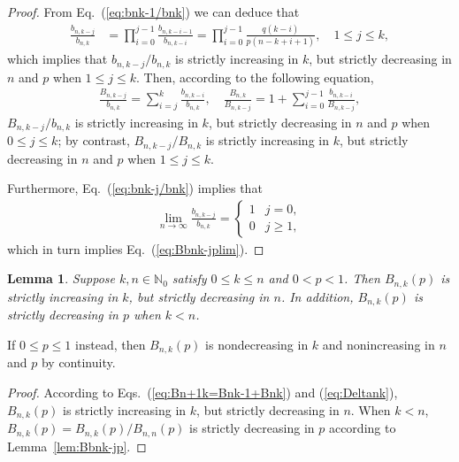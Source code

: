 \documentclass[aop]{imsart}
\theoremstyle{plain}
\newtheorem{lemma}[theorem]{Lemma}
\theoremstyle{remark}
\newcommand{\bbN}{\mathbb{N}}
\newcommand{\1}{\operatorname{\uppercase\expandafter{\romannumeral1}}}
\newcommand{\2}{\operatorname{\uppercase\expandafter{\romannumeral2}}}
\newcommand{\3}{\operatorname{\uppercase\expandafter{\romannumeral3}}}
\newcommand{\4}{\operatorname{\uppercase\expandafter{\romannumeral4}}}
\newcommand{\5}{\operatorname{\uppercase\expandafter{\romannumeral5}}}
\newcommand{\6}{\operatorname{\uppercase\expandafter{\romannumeral6}}}
\newcommand{\7}{\operatorname{\uppercase\expandafter{\romannumeral7}}}
\newcommand{\8}{\operatorname{\uppercase\expandafter{\romannumeral8}}}
\newcommand{\9}{\operatorname{\uppercase\expandafter{\romannumeral9}}}
\newcommand{\eref}[1]{Eq.~\textup{(\ref{#1})}}
\newcommand{\eqsref}[2]{Eqs.~(\ref{#1}) and (\ref{#2})}
\newcommand{\lref}[1]{Lemma~\ref{#1}}
\begin{document}
\begin{proof}
	From \eref{eq:bnk-1/bnk} we can deduce that
	\begin{align}
	\frac{b_{n,k-j}}{b_{n,k}}&=\prod_{i=0}^{j-1}\frac{b_{n,k-i-1}}{b_{n,k-i}}=\prod_{i=0}^{j-1}
	\frac{q (k-i)}{p(n-k+i+1)}, \quad 1\leq j\leq k,\label{eq:bnk-j/bnk}
	\end{align}
	which implies that $b_{n,k-j}/b_{n,k}$ is strictly increasing in $k$, but strictly decreasing in $n$ and $p$ when $1\leq j\leq k$. Then, according to the following equation,
	\begin{align}
	\frac{B_{n,k-j}}{b_{n,k}}=\sum_{i=j}^{k} \frac{b_{n,k-i}}{b_{n,k}}, \quad \frac{B_{n,k}}{B_{n,k-j}}=1+\sum_{i=0}^{j-1} \frac{b_{n,k-i}}{B_{n,k-j}},
	\end{align}
	$B_{n,k-j}/b_{n,k}$ is strictly increasing in $k$, but strictly decreasing in $n$ and $p$ when $0\leq j\leq k$; by contrast, $B_{n,k-j}/B_{n,k}$ is strictly increasing in $k$, but strictly decreasing in $n$ and $p$ when $1\leq j\leq k$.
	
	Furthermore, \eref{eq:bnk-j/bnk} implies that
	\begin{align}
	\lim_{n\to\infty}\frac{b_{n,k-j}}{b_{n,k}}=\begin{cases} 1 & j=0,\\
	0 &j\geq 1,
	\end{cases}
	\end{align}
	which in turn implies \eref{eq:Bbnk-jplim}. 
\end{proof}

\begin{lemma}\label{lem:Bnkpmono}
	Suppose  $k,n\in \bbN_0$ satisfy  $0\leq k\leq n$ and $0<p<1$. Then 	$B_{n,k}(p)$ is strictly increasing in $k$, but strictly decreasing in $n$. In addition, $B_{n,k}(p)$ is strictly decreasing in $p$ when $k<n$. 
\end{lemma}
If  $0\leq p\leq 1$ instead, then $B_{n,k}(p)$ is nondecreasing in  $k$ and nonincreasing in  $n$ and $p$ by continuity. 



\begin{proof}
	According to \eqsref{eq:Bn+1k=Bnk-1+Bnk}{eq:Deltank}, $B_{n,k}(p)$ is strictly increasing in $k$, but strictly decreasing in $n$. When $k<n$, $B_{n,k}(p)=B_{n,k}(p)/B_{n,n}(p)$ is strictly decreasing in $p$ according to \lref{lem:Bbnk-jp}.
\end{proof}
\end{document}
